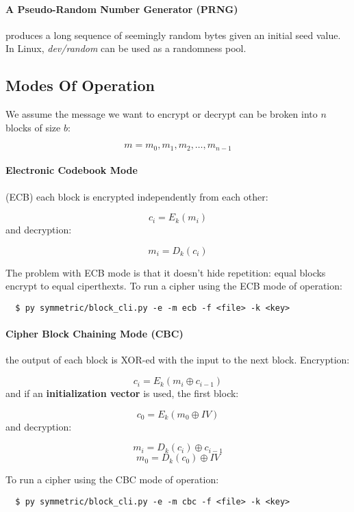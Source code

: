 \documentclass[12pt, letterpaper]{article}
\begin{document}
\paragraph{A Pseudo-Random Number Generator (PRNG)} produces a long sequence of seemingly random bytes given an initial seed value.
In Linux, \emph{dev/random} can be used as a randomness pool.

\subsection{Modes Of Operation}

We assume the message we want to encrypt or decrypt can be broken into $n$ blocks of size $b$:

\[
  m = m_0, m_1, m_2, \dots, m_{n-1}
\]

\paragraph{Electronic Codebook Mode} (ECB) each block is encrypted independently from each other:

\[
  c_i = E_k (m_i)
\]
and decryption:

\[
  m_i = D_k (c_i)
\]

The problem with ECB mode is that it doesn't hide repetition: equal blocks encrypt to equal ciperthexts.
To run a cipher using the ECB mode of operation:

\begin{verbatim}
  $ py symmetric/block_cli.py -e -m ecb -f <file> -k <key>
\end{verbatim}

\paragraph{Cipher Block Chaining Mode (CBC)} the output of each block is XOR-ed with the input to the next block.
Encryption:

\[
  c_i = E_k (m_i \oplus c_{i - 1})
\]
and if an \textbf{initialization vector} is used, the first block:

\[
  c_0 = E_k (m_0 \oplus IV)
\]
and decryption:

\[
  m_i = D_k (c_i) \oplus c_{i-1}
\]
\[
  m_0 = D_k(c_0) \oplus IV
\]

To run a cipher using the CBC mode of operation:

\begin{verbatim}
  $ py symmetric/block_cli.py -e -m cbc -f <file> -k <key>
\end{verbatim}
\end{document}
